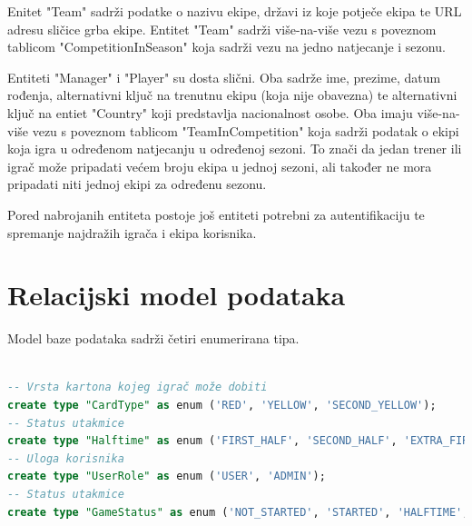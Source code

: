 \documentclass[times, utf8, zavrsni]{fer}
\begin{document}
Enitet "Team" sadrži podatke o nazivu ekipe, državi iz koje potječe ekipa te URL adresu sličice grba ekipe.
Entitet "Team" sadrži više-na-više vezu s poveznom tablicom "CompetitionInSeason" koja sadrži vezu na jedno natjecanje i sezonu.

Entiteti "Manager" i "Player" su dosta slični. Oba sadrže ime, prezime, datum rođenja, alternativni ključ na trenutnu ekipu (koja nije obavezna) te alternativni ključ na entiet "Country" koji predstavlja nacionalnost osobe.
Oba imaju više-na-više vezu s poveznom tablicom "TeamInCompetition" koja sadrži podatak o ekipi koja igra u određenom natjecanju u određenoj sezoni.
To znači da jedan trener ili igrač može pripadati većem broju ekipa u jednoj sezoni, ali također ne mora pripadati niti jednoj ekipi za određenu sezonu.

Pored nabrojanih entiteta postoje još entiteti potrebni za autentifikaciju te spremanje najdražih igrača i ekipa korisnika.

\section{Relacijski model podataka}

Model baze podataka sadrži četiri enumerirana tipa.
\begin{lstlisting}[caption=Enumerirani tipovi, language=SQL, numbers=none]

-- Vrsta kartona kojeg igrač može dobiti
create type "CardType" as enum ('RED', 'YELLOW', 'SECOND_YELLOW');
-- Status utakmice
create type "Halftime" as enum ('FIRST_HALF', 'SECOND_HALF', 'EXTRA_FIRST_HALF', 'EXTRA_SECOND_HALF');
-- Uloga korisnika
create type "UserRole" as enum ('USER', 'ADMIN');
-- Status utakmice
create type "GameStatus" as enum ('NOT_STARTED', 'STARTED', 'HALFTIME', 'OVER');

\end{lstlisting}
\end{document}
